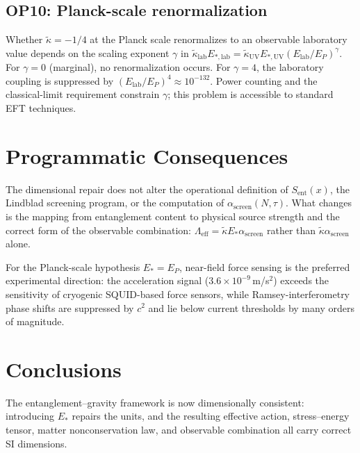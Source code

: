 \documentclass[11pt]{article}
\theoremstyle{plain}
\theoremstyle{definition}
\theoremstyle{remark}
\begin{document}
\subsection{OP10: Planck-scale renormalization}

Whether $\tilde{\kappa} = -1/4$ at the Planck scale renormalizes to an observable laboratory
value depends on the scaling exponent $\gamma$ in $\tilde{\kappa}_{\mathrm{lab}}E_{*,\mathrm{lab}}
= \tilde{\kappa}_{\mathrm{UV}}E_{*,\mathrm{UV}}(E_{\mathrm{lab}}/E_P)^\gamma$.  For $\gamma = 0$
(marginal), no renormalization occurs.  For $\gamma = 4$, the laboratory coupling is suppressed
by $(E_{\mathrm{lab}}/E_P)^4 \approx 10^{-132}$.  Power counting and the classical-limit
requirement constrain $\gamma$; this problem is accessible to standard EFT techniques.

\section{Programmatic Consequences}

The dimensional repair does not alter the operational definition of $S_{\mathrm{ent}}(x)$,
the Lindblad screening program, or the computation of $\alpha_{\mathrm{screen}}(N,\tau)$.
What changes is the mapping from entanglement content to physical source strength and the
correct form of the observable combination: $\Lambda_{\mathrm{eff}} = \tilde{\kappa}E_*\alpha_{\mathrm{screen}}$
rather than $\tilde{\kappa}\alpha_{\mathrm{screen}}$ alone.

For the Planck-scale hypothesis $E_* = E_P$, near-field force sensing is the preferred
experimental direction: the acceleration signal ($3.6\times10^{-9}$\,m/s$^2$) exceeds
the sensitivity of cryogenic SQUID-based force sensors, while Ramsey-interferometry phase
shifts are suppressed by $c^2$ and lie below current thresholds by many orders of magnitude.

\section{Conclusions}

The entanglement--gravity framework is now dimensionally consistent: introducing $E_*$ repairs the units, and the resulting effective action, stress--energy tensor, matter nonconservation law, and observable combination all carry correct SI dimensions.
\end{document}
